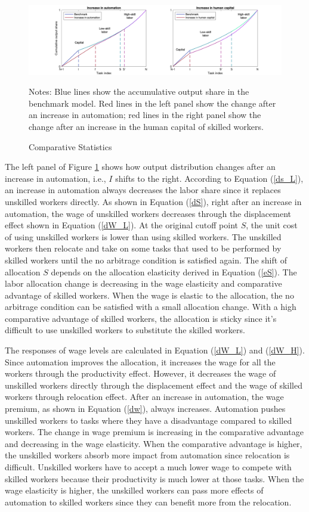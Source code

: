 \documentclass[12pt]{article}
\begin{document}
\begin{figure}[h!]
\includegraphics[width=\textwidth]{comparative}
\caption{Comparative Statistics}
\label{comparative}
{\scriptsize Notes: Blue lines show the accumulative output share in the benchmark model. Red lines in the left panel show the change after an increase in automation; red lines in the right panel show the change after an increase in the human capital of skilled workers.}
\end{figure}

The left panel of Figure \ref{comparative} shows how output distribution changes after an increase in automation, i.e., $I$ shifts to the right. According to Equation (\ref{ds_L}), an increase in automation always decreases the labor share since it replaces unskilled workers directly. As shown in Equation (\ref{dS}), right after an increase in automation, the wage of unskilled workers decreases through the displacement effect shown in Equation (\ref{dW_L}). At the original cutoff point $S$, the unit cost of using unskilled workers is lower than using skilled workers. The unskilled workers then relocate and take on some tasks that used to be performed by skilled workers until the no arbitrage condition is satisfied again. The shift of allocation $S$ depends on the allocation elasticity derived in Equation (\ref{eS}). The labor allocation change is decreasing in the wage elasticity and comparative advantage of skilled workers. When the wage is elastic to the allocation, the no arbitrage condition can be satisfied with a small allocation change. With a high comparative advantage of skilled workers, the allocation is sticky since it's difficult to use unskilled workers to substitute the skilled workers.

The responses of wage levels are calculated in Equation (\ref{dW_L}) and (\ref{dW_H}). Since automation improves the allocation, it increases the wage for all the workers through the productivity effect. However, it decreases the wage of unskilled workers directly through the displacement effect and the wage of skilled workers through relocation effect. After an increase in automation, the wage premium, as shown in Equation (\ref{dw}), always increases. Automation pushes unskilled workers to tasks where they have a disadvantage compared to skilled workers. The change in wage premium is increasing in the comparative advantage and decreasing in the wage elasticity. When the comparative advantage is higher, the unskilled workers absorb more impact from automation since relocation is difficult. Unskilled workers have to accept a much lower wage to compete with skilled workers because their productivity is much lower at those tasks. When the wage elasticity is higher, the unskilled workers can pass more effects of automation to skilled workers since they can benefit more from the relocation.
\end{document}
